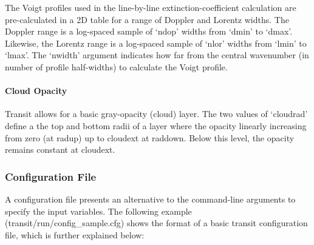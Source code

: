 \documentclass[letterpaper, 12pt]{article}
\begin{document}
The Voigt profiles used in the line-by-line extinction-coefficient
calculation are pre-calculated in a 2D table for a range of
Doppler and Lorentz widths.  The Doppler range is a log-spaced sample
of `{\tttb ndop}' widths from `{\tttb dmin}' to `{\tttb dmax}'.
Likewise, the Lorentz range is a log-spaced sample
of `{\tttb nlor}' widths from `{\tttb lmin}' to `{\tttb lmax}'.
The `{\tttm nwidth}' argument indicates how far from the central
wavenumber (in number of profile half-widths) to calculate the Voigt
profile.

\paragraph{Cloud Opacity}

Transit allows for a basic gray-opacity (cloud) layer.  The two values
of {\tttm `cloudrad'} define a the top and bottom radii of a layer
where the opacity linearly increasing from zero (at {\tttb radup}) up
to {\tttb cloudext} at {\tttb raddown}.  Below this level, the
opacity remains constant at {\tttb cloudext}.


\subsubsection{Configuration File}
\label{sec:transitcfg}

A configuration file presents an alternative to the command-line
arguments to specify the input variables.  The following example
({\tttb transit/run/config\_sample.cfg}) shows the format of a basic
transit configuration file, which is further explained below: \newline
\end{document}
